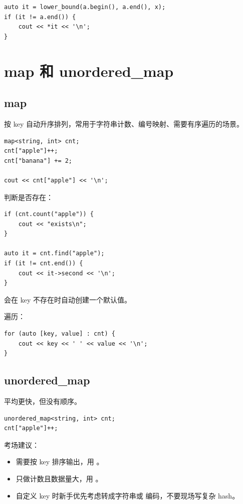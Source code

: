 
\begin{lstlisting}
auto it = lower_bound(a.begin(), a.end(), x);
if (it != a.end()) {
    cout << *it << '\n';
}
\end{lstlisting}

\section{map 和 unordered\_map}\label{sec:04-17}

\subsection{map}

 按 key 自动升序排列，常用于字符串计数、编号映射、需要有序遍历的场景。

\begin{lstlisting}
map<string, int> cnt;
cnt["apple"]++;
cnt["banana"] += 2;

cout << cnt["apple"] << '\n';
\end{lstlisting}

判断是否存在：

\begin{lstlisting}
if (cnt.count("apple")) {
    cout << "exists\n";
}

auto it = cnt.find("apple");
if (it != cnt.end()) {
    cout << it->second << '\n';
}
\end{lstlisting}

 会在 key 不存在时自动创建一个默认值。

遍历：

\begin{lstlisting}
for (auto [key, value] : cnt) {
    cout << key << ' ' << value << '\n';
}
\end{lstlisting}

\subsection{unordered\_map}

 平均更快，但没有顺序。

\begin{lstlisting}
unordered_map<string, int> cnt;
cnt["apple"]++;
\end{lstlisting}

考场建议：

\begin{itemize}
  \item 需要按 key 排序输出，用 。
  \item 只做计数且数据量大，用 。
  \item 自定义 key 时新手优先考虑转成字符串或  编码，不要现场写复杂 hash。
\end{itemize}


